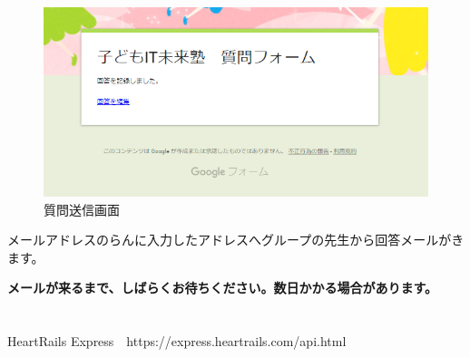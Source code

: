



\begin{figure}[H]
  
    \begin{center}
      
      \includegraphics[width=\textwidth]{./text08-img/textbook-img069.png}
      \caption{\label{fig:refFigure2}質問送信画面}
    \end{center}
    
\end{figure}


メールアドレスのらんに入力したアドレスへグループの先生から回答メールがきます。

{\bfseries
\textmd{メールが来るまで、しばらくお待ちください。数日かかる場合があります。}}

\bigskip
\section{}
HeartRails Express　https://express.heartrails.com/api.html

